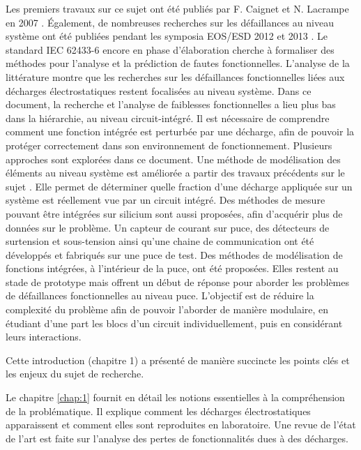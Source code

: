 Les premiers travaux sur ce sujet ont été publiés par F. Caignet et N. Lacrampe en 2007 \cite{LacrampeTransientImmunity}.
Également, de nombreuses recherches sur les défaillances au niveau système ont été publiées pendant les symposia EOS/ESD 2012 \cite{soft-error-esd-1,SDRAMCase,mixedModeESDSims} et 2013 \cite{softFailSubsystem, powered-tlp-soft-fail}.
Le standard IEC 62433-6 \cite{iec62433-6} encore en phase d'élaboration cherche à formaliser des méthodes pour l'analyse et la prédiction de fautes fonctionnelles.
L'analyse de la littérature montre que les recherches sur les défaillances fonctionnelles liées aux décharges électrostatiques restent focalisées au niveau système.
Dans ce document, la recherche et l'analyse de faiblesses fonctionnelles a lieu plus bas dans la hiérarchie, au niveau circuit-intégré.
Il est nécessaire de comprendre comment une fonction intégrée est perturbée par une décharge, afin de pouvoir la protéger correctement dans son environnement de fonctionnement.
Plusieurs approches sont explorées dans ce document.
Une méthode de modélisation des éléments au niveau système est améliorée a partir des travaux précédents sur le sujet \cite{phd-lacrampe, phd-monnereau}.
Elle permet de déterminer quelle fraction d'une décharge appliquée sur un système est réellement vue par un circuit intégré.
Des méthodes de mesure pouvant être intégrées sur silicium sont aussi proposées, afin d'acquérir plus de données sur le problème.
Un capteur de courant sur puce, des détecteurs de surtension et sous-tension ainsi qu'une chaine de communication ont été développés et fabriqués sur une puce de test.
Des méthodes de modélisation de fonctions intégrées, à l'intérieur de la puce, ont été proposées.
Elles restent au stade de prototype mais offrent un début de réponse pour aborder les problèmes de défaillances fonctionnelles au niveau puce.
L'objectif est de réduire la complexité du problème afin de pouvoir l'aborder de manière modulaire, en étudiant d'une part les blocs d'un circuit individuellement, puis en considérant leurs interactions.

%
Cette introduction (chapitre 1) a présenté de manière succincte les points clés et les enjeux du sujet de recherche.

Le chapitre \ref{chap:1} fournit en détail les notions essentielles à la compréhension de la problématique.
Il explique comment les décharges électrostatiques apparaissent et comment elles sont reproduites en laboratoire.
Une revue de l'état de l'art est faite sur l'analyse des pertes de fonctionnalités dues à des décharges.

